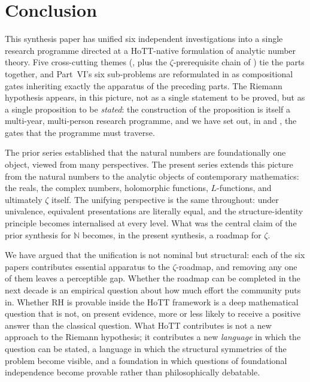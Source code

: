 \documentclass[12pt]{article}
\theoremstyle{definition}
\theoremstyle{remark}
\newcommand{\N}{\mathbb{N}}
\begin{document}
\section{Conclusion}\label{sec:conclusion}

This synthesis paper has unified six independent investigations into a
single research programme directed at a HoTT-native formulation of
analytic number theory. Five cross-cutting themes
(, plus
the $\zeta$-prerequisite chain of ) tie the parts
together, and Part~VI's six sub-problems are reformulated in
 as compositional gates inheriting exactly the
apparatus of the preceding parts. The Riemann hypothesis appears, in
this picture, not as a single statement to be proved, but as a single
proposition to be \emph{stated}: the construction of the proposition is
itself a multi-year, multi-person research programme, and we have set
out, in  and , the gates that the
programme must traverse.

The prior series \cite{paperI,paperII,paperIII,paperIV,paperV,paperVI,priorSynthesis}
established that the natural numbers are foundationally one object,
viewed from many perspectives. The present series extends this picture
from the natural numbers to the analytic objects of contemporary
mathematics: the reals, the complex numbers, holomorphic functions,
$L$-functions, and ultimately $\zeta$ itself. The unifying perspective
is the same throughout: under univalence, equivalent presentations are
literally equal, and the structure-identity principle becomes
internalised at every level. What was the central claim of the prior
synthesis for $\N$ becomes, in the present synthesis, a roadmap for
$\zeta$.

We have argued that the unification is not nominal but structural: each
of the six papers contributes essential apparatus to the
$\zeta$-roadmap, and removing any one of them leaves a perceptible gap.
Whether the roadmap can be completed in the next decade is an empirical
question about how much effort the community puts in. Whether
$\mathrm{RH}$ is provable inside the HoTT framework is a deep
mathematical question that is not, on present evidence, more or less
likely to receive a positive answer than the classical question. What
HoTT contributes is not a new approach to the Riemann hypothesis; it
contributes a new \emph{language} in which the question can be stated, a
language in which the structural symmetries of the problem become
visible, and a foundation in which questions of foundational independence
become provable rather than philosophically debatable.
\end{document}
